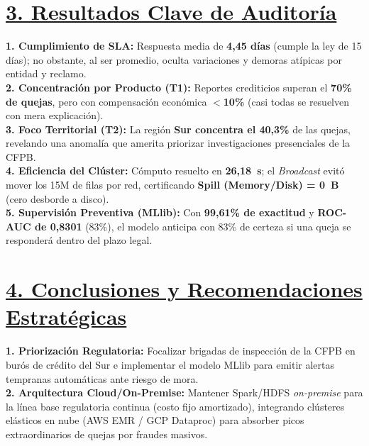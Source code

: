 \documentclass[12pt,letterpaper]{article}
\begin{document}
\section*{\underline{3. Resultados Clave de Auditoría}}
\textbf{1. Cumplimiento de SLA:} Respuesta media de \textbf{4,45 días} (cumple la ley de 15 días); no obstante, al ser promedio, oculta variaciones y demoras atípicas por entidad y reclamo. \\
\textbf{2. Concentración por Producto (T1):} Reportes crediticios superan el \textbf{70\% de quejas}, pero con compensación económica \textbf{$<$10\%} (casi todas se resuelven con mera explicación). \\
\textbf{3. Foco Territorial (T2):} La región \textbf{Sur concentra el 40,3\%} de las quejas, revelando una anomalía que amerita priorizar investigaciones presenciales de la CFPB. \\
\textbf{4. Eficiencia del Clúster:} Cómputo resuelto en \textbf{26,18~s}; el \textit{Broadcast} evitó mover los 15M de filas por red, certificando \textbf{Spill (Memory/Disk) = 0~B} (cero desborde a disco). \\
\textbf{5. Supervisión Preventiva (MLlib):} Con \textbf{99,61\% de exactitud} y \textbf{ROC-AUC de 0,8301} (83\%), el modelo anticipa con 83\% de certeza si una queja se responderá dentro del plazo legal.

\section*{\underline{4. Conclusiones y Recomendaciones Estratégicas}}
\textbf{1. Priorización Regulatoria:} Focalizar brigadas de inspección de la CFPB en burós de crédito del Sur e implementar el modelo MLlib para emitir alertas tempranas automáticas ante riesgo de mora. \\
\textbf{2. Arquitectura Cloud/On-Premise:} Mantener Spark/HDFS \textit{on-premise} para la línea base regulatoria continua (costo fijo amortizado), integrando clústeres elásticos en nube (AWS EMR / GCP Dataproc) para absorber picos extraordinarios de quejas por fraudes masivos.
\end{document}

